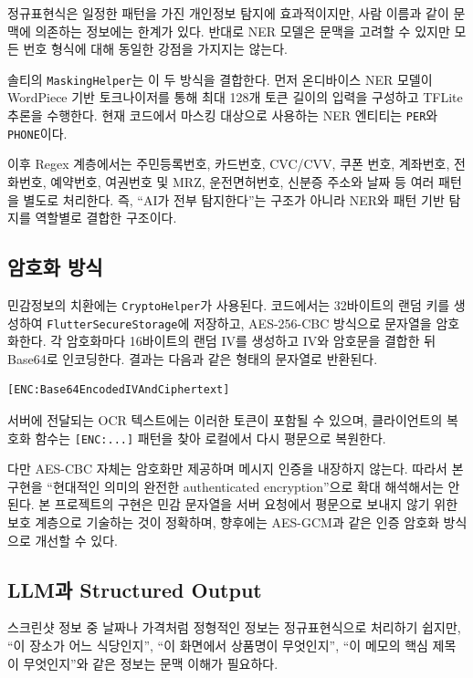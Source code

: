 \documentclass[11pt,a4paper]{article}
\begin{document}
정규표현식은 일정한 패턴을 가진 개인정보 탐지에 효과적이지만, 사람 이름과 같이 문맥에 의존하는 정보에는 한계가 있다. 반대로 NER 모델은 문맥을 고려할 수 있지만 모든 번호 형식에 대해 동일한 강점을 가지지는 않는다.

솔티의 \texttt{MaskingHelper}는 이 두 방식을 결합한다. 먼저 온디바이스 NER 모델이 WordPiece 기반 토크나이저를 통해 최대 128개 토큰 길이의 입력을 구성하고 TFLite 추론을 수행한다. 현재 코드에서 마스킹 대상으로 사용하는 NER 엔티티는 \texttt{PER}와 \texttt{PHONE}이다.

이후 Regex 계층에서는 주민등록번호, 카드번호, CVC/CVV, 쿠폰 번호, 계좌번호, 전화번호, 예약번호, 여권번호 및 MRZ, 운전면허번호, 신분증 주소와 날짜 등 여러 패턴을 별도로 처리한다. 즉, ``AI가 전부 탐지한다''는 구조가 아니라 NER와 패턴 기반 탐지를 역할별로 결합한 구조이다.

\subsection{암호화 방식}

민감정보의 치환에는 \texttt{CryptoHelper}가 사용된다. 코드에서는 32바이트의 랜덤 키를 생성하여 \texttt{FlutterSecureStorage}에 저장하고, AES-256-CBC 방식으로 문자열을 암호화한다. 각 암호화마다 16바이트의 랜덤 IV를 생성하고 IV와 암호문을 결합한 뒤 Base64로 인코딩한다. 결과는 다음과 같은 형태의 문자열로 반환된다.

\begin{lstlisting}
[ENC:Base64EncodedIVAndCiphertext]
\end{lstlisting}

서버에 전달되는 OCR 텍스트에는 이러한 토큰이 포함될 수 있으며, 클라이언트의 복호화 함수는 \texttt{[ENC:...]} 패턴을 찾아 로컬에서 다시 평문으로 복원한다.

다만 AES-CBC 자체는 암호화만 제공하며 메시지 인증을 내장하지 않는다. 따라서 본 구현을 ``현대적인 의미의 완전한 authenticated encryption''으로 확대 해석해서는 안 된다. 본 프로젝트의 구현은 민감 문자열을 서버 요청에서 평문으로 보내지 않기 위한 보호 계층으로 기술하는 것이 정확하며, 향후에는 AES-GCM과 같은 인증 암호화 방식으로 개선할 수 있다.

\subsection{LLM과 Structured Output}

스크린샷 정보 중 날짜나 가격처럼 정형적인 정보는 정규표현식으로 처리하기 쉽지만, ``이 장소가 어느 식당인지'', ``이 화면에서 상품명이 무엇인지'', ``이 메모의 핵심 제목이 무엇인지''와 같은 정보는 문맥 이해가 필요하다.
\end{document}
